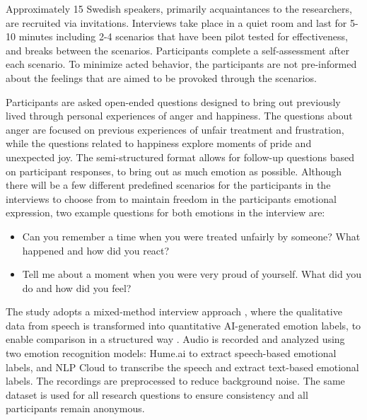 Approximately 15 Swedish speakers, primarily acquaintances to the researchers, are recruited via invitations. Interviews take place in a quiet room and last for 5-10 minutes including 2-4 scenarios that have been pilot tested for effectiveness, and breaks between the scenarios. Participants complete a self-assessment after each scenario. To minimize acted behavior, the participants are not pre-informed about the feelings that are aimed to be provoked through the scenarios.

Participants are asked open-ended questions designed to bring out previously lived through personal experiences of anger and happiness. The questions about anger are focused on previous experiences of unfair treatment and frustration, while the questions related to happiness explore moments of pride and unexpected joy. The semi-structured format allows for follow-up questions based on participant responses, to bring out as much emotion as possible.
Although there will be a few different predefined scenarios for the participants in the interviews to choose from to maintain freedom in the participants emotional expression, two example questions for both emotions in the interview are:
\begin{itemize}
    \item Can you remember a time when you were treated unfairly by someone? What happened and how did you react?
    \item Tell me about a moment when you were very proud of yourself. What did you do and how did you feel?
\end{itemize}
The study adopts a mixed-method interview approach \autocite{Bryman2022}, where the qualitative data from speech is transformed into quantitative AI-generated emotion labels, to enable comparison in a structured way \autocite{Creswell2023}.
Audio is recorded and analyzed using two emotion recognition models: Hume.ai to extract speech-based emotional labels, and NLP Cloud to transcribe the speech and extract text-based emotional labels. The recordings are preprocessed to reduce background noise. The same dataset is used for all research questions to ensure consistency and all participants remain anonymous.

